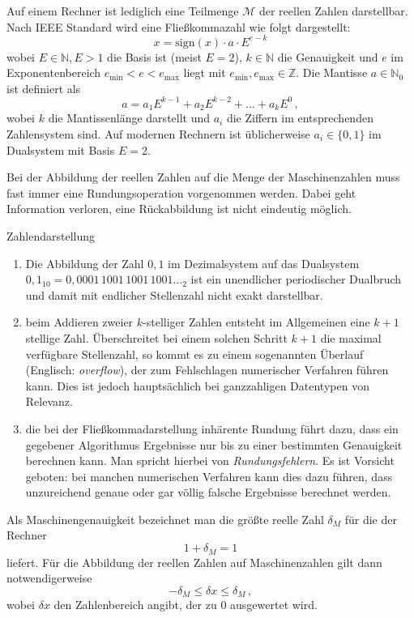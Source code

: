 Auf einem Rechner ist lediglich eine Teilmenge $\mathcal{M}$ der reellen Zahlen darstellbar.
Nach IEEE Standard wird eine Fließkommazahl wie folgt dargestellt:
\begin{equation}
x = \mathrm{sign}(x)\cdot a\cdot E^{e-k}
\end{equation}
wobei $E\in \mathbb{N}, E>1$ die Basis ist (meist $E=2$), $k\in \mathbb{N}$ die Genauigkeit und $e$ im Exponentenbereich $e_\mathrm{min}<e<e_\mathrm{max}$ liegt mit $e_\mathrm{min},e_\mathrm{max}\in \mathbb{Z}$.
Die Mantisse $a\in \mathbb{N}_0$ ist  definiert als
\begin{equation}
a = a_1 E^{k-1} + a_2 E^{k-2} + ... + a_k E^0\,,
\end{equation}
wobei $k$ die Mantissenlänge darstellt und $a_i$ die Ziffern im
entsprechenden Zahlensystem sind. Auf modernen Rechnern ist
üblicherweise $a_i\in\{0,1\}$ im Dualsystem mit Basis $E=2$.

Bei der Abbildung der reellen Zahlen auf die Menge der Maschinenzahlen
muss fast immer eine Rundungsoperation vorgenommen werden. Dabei geht
Information verloren, eine Rückabbildung ist nicht eindeutig möglich.

\begin{myalertblock}{Zahlendarstellung}
  \begin{enumerate}
   \item Die Abbildung der Zahl $0{,}1$ im Dezimalsystem auf das
    Dualsystem $0{,}1_{10} = 0{,}0001\,1001\,1001\,1001\ldots_2$ ist ein unendlicher
    periodischer Dualbruch und damit mit endlicher Stellenzahl nicht
    exakt darstellbar.
  \item beim Addieren zweier $k$-stelliger Zahlen entsteht im
    Allgemeinen eine $k+1$ stellige Zahl. Überschreitet bei einem
    solchen Schritt $k+1$ die maximal verfügbare Stellenzahl, so kommt
    es zu einem sogenannten Überlauf (Englisch: \emph{overflow}), der
    zum Fehlschlagen numerischer Verfahren führen kann. Dies ist jedoch
    hauptsächlich bei ganzzahligen Datentypen von Relevanz.
  \item die bei der Fließkommadarstellung inhärente Rundung führt dazu, dass 
    ein gegebener Algorithmus Ergebnisse nur bis zu einer bestimmten Genauigkeit
    berechnen kann. Man spricht hierbei von \emph{Rundungsfehlern}.
    Es ist Vorsicht geboten: bei manchen numerischen Verfahren kann dies dazu führen,
    dass unzureichend genaue oder gar völlig falsche Ergebnisse berechnet werden.
    
  \end{enumerate}
\end{myalertblock}
Als Maschinengenauigkeit bezeichnet man die größte reelle Zahl $\delta_M$ für die der Rechner
\begin{equation}
1 + \delta_M = 1
\end{equation}
liefert.
Für die Abbildung der reellen Zahlen auf Maschinenzahlen gilt dann notwendigerweise
\begin{equation}
-\delta_M \leq \delta x\leq \delta_M\,,
\end{equation}
wobei $\delta x$ den Zahlenbereich angibt, der zu $0$ ausgewertet wird.

